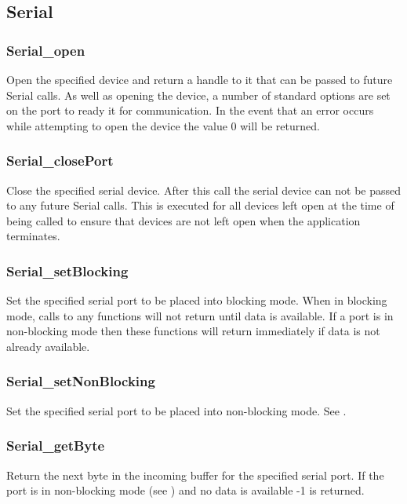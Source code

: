 \subsection{Serial} \label{apiserial}
\subsubsection{Serial\_open} \label{apiserialopen}
 Open the specified device
and return a handle to it that can be passed to future Serial calls. As well as
opening the device, a number of standard options are set on the port to ready it
for communication. In the event that an error occurs while attempting to open
the device the value 0 will be returned. 

\subsubsection{Serial\_closePort} \label{apiserialclose}
 Close the specified serial
device. After this call the serial device can not be passed to any future Serial
calls. This is executed for all devices left open at the time of
 being called to ensure that
devices are not left open when the application terminates.

\subsubsection{Serial\_setBlocking} \label{apiserialblocking}
 Set the specified serial port to
be placed into blocking mode. When in blocking mode, calls to any
 functions will not return until data is available. If a port
is in non-blocking mode then these functions will return immediately if data is
not already available.

\subsubsection{Serial\_setNonBlocking} \label{apiserialnonblocking}
 Set the specified serial port
to be placed into non-blocking mode. See
.

\subsubsection{Serial\_getByte} \label{apiserialgetbyte}
 Return the next byte in the incoming
buffer for the specified serial port. If the port is in non-blocking mode (see
) and no data is
available -1 is returned. 

